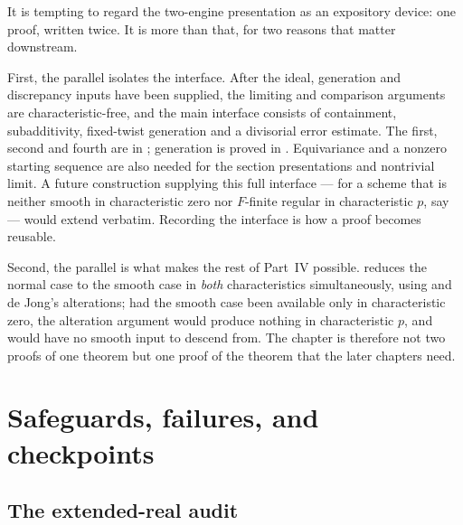 \begin{remark}
\label{rem:ch40-parallel-value}
It is tempting to regard the two-engine presentation as an expository
device: one proof, written twice.  It is more than that, for two reasons
that matter downstream.

First, the parallel isolates the interface.  After the ideal, generation and discrepancy inputs have been supplied,
the limiting and comparison arguments are characteristic-free, and the
main interface consists of containment, subadditivity, fixed-twist
generation and a divisorial error estimate.  The first, second and fourth
are in ; generation is proved in
.  Equivariance and a nonzero starting sequence
are also needed for the section presentations and nontrivial limit.
A future construction supplying this full interface --- for a scheme that is neither smooth in characteristic
zero nor $F$-finite regular in characteristic $p$, say --- would extend
 verbatim.  Recording the interface is how a
proof becomes reusable.

Second, the parallel is what makes the rest of Part~IV possible.
 reduces the normal case to the smooth case in
\emph{both} characteristics simultaneously, using
 and de Jong's alterations; had the smooth
case been available only in characteristic zero, the alteration argument
would produce nothing in characteristic $p$, and
 would have no smooth input to
descend from.  The chapter is therefore not two proofs of one theorem but
one proof of the theorem that the later chapters need.
\end{remark}

\section{Safeguards, failures, and checkpoints}
\label{sec:ch40-audit}

\subsection{The extended-real audit}
\label{sec:ch40-extended-real}

